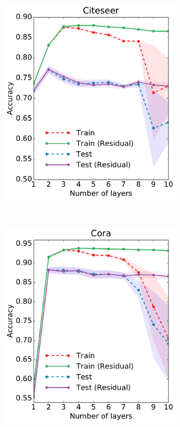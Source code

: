 \documentclass{article} %
\begin{document}
\begin{figure}[htbp]
\centering
\begin{subfigure}[b]{0.33\textwidth}
    \centering
    \includegraphics[width=\textwidth]{citeseer.pdf}
    \label{fig:model-depth-a}
\end{subfigure}%
~
\begin{subfigure}[b]{0.33\textwidth}
    \centering
    \includegraphics[width=\textwidth]{cora.pdf}

\end{subfigure}
\end{figure}
\end{document}
